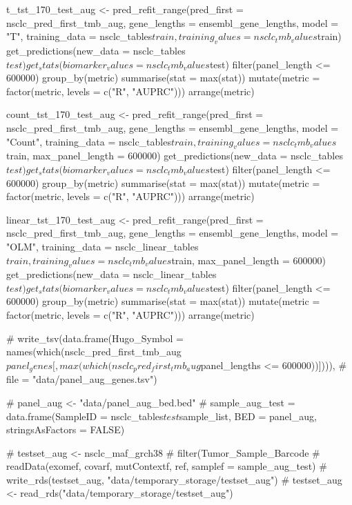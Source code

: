 {t_tst_170_test_aug <- pred_refit_range(pred_first = nsclc_pred_first_tmb_aug, gene_lengths = ensembl_gene_lengths, model = "T",
                                   training_data = nsclc_tables$train, training_values = nsclc_tmb_values$train) %
  get_predictions(new_data = nsclc_tables$test) %
  get_stats(biomarker_values = nsclc_tmb_values$test) %
  filter(panel_length <= 600000) %
  group_by(metric) %
  summarise(stat = max(stat)) %
  mutate(metric = factor(metric, levels = c("R", "AUPRC"))) %
  arrange(metric)

count_tst_170_test_aug <- pred_refit_range(pred_first = nsclc_pred_first_tmb_aug, gene_lengths = ensembl_gene_lengths, model = "Count",
                                       training_data = nsclc_tables$train, training_values = nsclc_tmb_values$train, max_panel_length = 600000) %
  get_predictions(new_data = nsclc_tables$test) %
  get_stats(biomarker_values = nsclc_tmb_values$test) %
  filter(panel_length <= 600000) %
  group_by(metric) %
  summarise(stat = max(stat)) %
  mutate(metric = factor(metric, levels = c("R", "AUPRC"))) %
  arrange(metric)

linear_tst_170_test_aug <- pred_refit_range(pred_first = nsclc_pred_first_tmb_aug, gene_lengths = ensembl_gene_lengths, model = "OLM",
                                       training_data = nsclc_linear_tables$train, training_values = nsclc_tmb_values$train, max_panel_length = 600000) %
  get_predictions(new_data = nsclc_linear_tables$test) %
  get_stats(biomarker_values = nsclc_tmb_values$test) %
  filter(panel_length <= 600000) %
  group_by(metric) %
  summarise(stat = max(stat)) %
  mutate(metric = factor(metric, levels = c("R", "AUPRC"))) %
  arrange(metric)

# write_tsv(data.frame(Hugo_Symbol = names(which(nsclc_pred_first_tmb_aug$panel_genes[, max(which(nsclc_pred_first_tmb_aug$panel_lengths <= 600000))]))),
#           file = "data/panel_aug_genes.tsv")

# panel_aug <- "data/panel_aug_bed.bed"
# sample_aug_test = data.frame(SampleID = nsclc_tables$test$sample_list, BED = panel_aug, stringsAsFactors = FALSE)

# testset_aug <- nsclc_maf_grch38 %
#   filter(Tumor_Sample_Barcode %
#   readData(exomef, covarf, mutContextf, ref, samplef = sample_aug_test)
# write_rds(testset_aug, "data/temporary_storage/testset_aug")
# testset_aug <- read_rds("data/temporary_storage/testset_aug")

}
